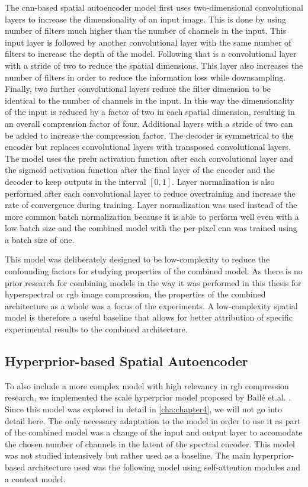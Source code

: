 The \ac{cnn}-based spatial autoencoder model first uses two-dimensional convolutional layers to increase the dimensionality of an input image. This is done by using number of filters much higher than the number of channels in the input. This input layer is followed by another convolutional layer with the same number of filters to increase the depth of the model. Following that is a convolutional layer with a stride of two to reduce the spatial dimensions. This layer also increases the number of filters in order to reduce the information loss while downsampling. Finally, two further convolutional layers reduce the filter dimension to be identical to the number of channels in the input. In this way the dimensionality of the input is reduced by a factor of two in each spatial dimension, resulting in an overall compression factor of four. Additional layers with a stride of two can be added to increase the compression factor. The decoder is symmetrical to the encoder but replaces convolutional layers with transposed convolutional layers. The model uses the \ac{prelu} activation function after each convolutional layer and the sigmoid activation function after the final layer of the encoder and the decoder to keep outputs in the interval $[0,1]$. Layer normalization \citep{ba_layer_2016} is also performed after each convolutional layer to reduce overtraining and increase the rate of convergence during training. Layer normalization was used instead of the more common batch normalization because it is able to perform well even with a low batch size and the combined model with the per-pixel \ac{cnn} was trained using a batch size of one.

This model was deliberately designed to be low-complexity to reduce the confounding factors for studying properties of the combined model. As there is no prior research for combining models in the way it was performed in this thesis for hyperspectral or \ac{rgb} image compression, the properties of the combined architecture as a whole was a focus of the experiments. A low-complexity spatial model is therefore a useful baseline that allows for better attribution of specific experimental results to the combined architecture.
\subsection{Hyperprior-based Spatial Autoencoder}
To also include a more complex model with high relevancy in \ac{rgb} compression research, we implemented the scale hyperprior model proposed by Ballé et.al. \citep{balle_end--end_2017}. Since this model was explored in detail in \autoref{cha:chapter4}, we will not go into detail here. The only necessary adaptation to the model in order to use it as part of the combined model was a change of the input and output layer to accomodate the chosen number of channels in the latent of the spectral encoder. This model was not studied intensively but rather used as a baseline. The main hyperprior-based architecture used was the following model using self-attention modules and a context model.
